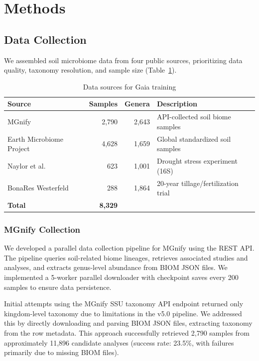 \documentclass[11pt,a4paper]{article}
\begin{document}
\section{Methods}

\subsection{Data Collection}

We assembled soil microbiome data from four public sources, prioritizing data quality, taxonomy resolution, and sample size (Table~\ref{tab:data}).

\begin{table}[H]
\centering
\caption{Data sources for Gaia training}
\label{tab:data}
\begin{tabular}{lrrl}
\toprule
\textbf{Source} & \textbf{Samples} & \textbf{Genera} & \textbf{Description} \\
\midrule
MGnify & 2,790 & 2,643 & API-collected soil biome samples \\
Earth Microbiome Project & 4,628 & 1,659 & Global standardized soil samples \\
Naylor et al. \citep{naylor2017drought} & 623 & 1,001 & Drought stress experiment (16S) \\
BonaRes Westerfeld \citep{bonares2025} & 288 & 1,864 & 20-year tillage/fertilization trial \\
\midrule
\textbf{Total} & \textbf{8,329} & & \\
\bottomrule
\end{tabular}
\end{table}

\subsubsection{MGnify Collection}

We developed a parallel data collection pipeline for MGnify using the REST API. The pipeline queries soil-related biome lineages, retrieves associated studies and analyses, and extracts genus-level abundance from BIOM JSON files. We implemented a 5-worker parallel downloader with checkpoint saves every 200 samples to ensure data persistence.

Initial attempts using the MGnify SSU taxonomy API endpoint returned only kingdom-level taxonomy due to limitations in the v5.0 pipeline. We addressed this by directly downloading and parsing BIOM JSON files, extracting taxonomy from the row metadata. This approach successfully retrieved 2,790 samples from approximately 11,896 candidate analyses (success rate: 23.5\%, with failures primarily due to missing BIOM files).
\end{document}
